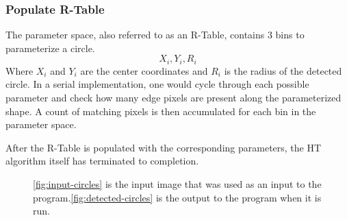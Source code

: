 \documentclass[conference]{IEEEtran}
\begin{document}
\subsubsection{Populate R-Table}
The parameter space, also referred to as an R-Table, contains 3 bins to parameterize a circle.
\begin{equation}
  X_{i}, Y_{i}, R_{i}\label{circle-parameters}
\end{equation}
Where $X_i$ and $Y_i$ are the center coordinates and $R_i$ is the radius of the detected circle.
In a serial implementation, one would cycle through each possible parameter and check how many edge pixels are present along the parameterized shape. 
A count of matching pixels is then accumulated for each bin in the parameter space.


After the R-Table is populated with the corresponding parameters, the HT algorithm itself has terminated to completion. 






\begin{figure}%
  \centering
  \hfil
  \caption{\autoref{fig:input-circles} is the input image that was used as an input to the program.\autoref{fig:detected-circles} is the output to the program when it is run.}
\end{figure}
\end{document}
